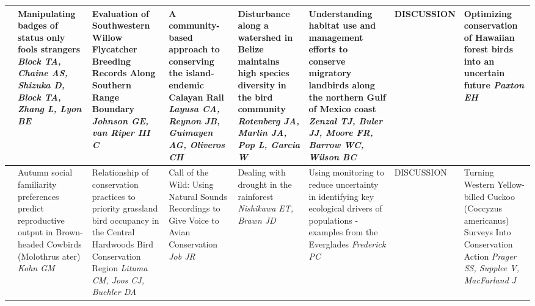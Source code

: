 \begin{tabular}{|x{0.85cm}|x{2.85cm}|x{2.85cm}|x{2.85cm}|x{2.85cm}|a{2.85cm}|a{2.85cm}|a{2.85cm}|}
\hline
{}&Manipulating badges of status only fools strangers \newline \newline \textit{Block TA, Chaine AS, Shizuka D, Block TA, Zhang L, Lyon BE} & Evaluation of Southwestern Willow Flycatcher Breeding Records Along Southern Range Boundary \newline \newline \textit{Johnson GE, van Riper III C} & A community-based approach to conserving the island-endemic Calayan Rail \newline \newline \textit{Layusa CA, Reynon JB, Guimayen AG, Oliveros CH} & Disturbance along a watershed in Belize maintains high species diversity in the bird community \newline \newline \textit{Rotenberg JA, Marlin JA, Pop L, Garcia W} & Understanding habitat use and management efforts to conserve migratory landbirds along the northern Gulf of Mexico coast \newline \newline \textit{Zenzal TJ, Buler JJ, Moore FR, Barrow WC, Wilson BC} & DISCUSSION \newline \newline \textit{} & Optimizing conservation of Hawaiian forest birds into an uncertain future \newline \newline \textit{Paxton EH}\\
\hline
{}&Autumn social familiarity preferences predict reproductive output in Brown-headed Cowbirds (Molothrus ater) \newline \newline \textit{Kohn GM} & Relationship of conservation practices to priority grassland bird occupancy in the Central Hardwoods Bird Conservation Region \newline \newline \textit{Lituma CM, Joos CJ, Buehler DA} & Call of the Wild: Using Natural Sounds Recordings to Give Voice to Avian Conservation \newline \newline \textit{Job JR} & Dealing with drought in the rainforest \newline \newline \textit{Nishikawa ET, Brawn JD} & Using monitoring to reduce uncertainty in identifying key ecological drivers of populations - examples from the Everglades \newline \newline \textit{Frederick PC} & DISCUSSION \newline \newline \textit{} & Turning Western Yellow-billed Cuckoo (Coccyzus americanus) Surveys Into Conservation Action \newline \newline \textit{Prager SS, Supplee V, MacFarland J}\\

\end{tabular}
